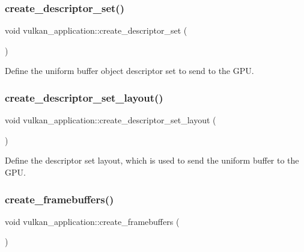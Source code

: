 \subsubsection{\texorpdfstring{create\+\_\+descriptor\+\_\+set()}{create\_descriptor\_set()}}
{\footnotesize\ttfamily void vulkan\+\_\+application\+::create\+\_\+descriptor\+\_\+set (\begin{DoxyParamCaption}{ }\end{DoxyParamCaption})\hspace{0.3cm}{\ttfamily [private]}}



Define the uniform buffer object descriptor set to send to the G\+PU. 

\mbox{\label{classvulkan__application_a85db969a681ae5ee7e43080ade7b7769}} 
\subsubsection{\texorpdfstring{create\+\_\+descriptor\+\_\+set\+\_\+layout()}{create\_descriptor\_set\_layout()}}
{\footnotesize\ttfamily void vulkan\+\_\+application\+::create\+\_\+descriptor\+\_\+set\+\_\+layout (\begin{DoxyParamCaption}{ }\end{DoxyParamCaption})\hspace{0.3cm}{\ttfamily [private]}}



Define the descriptor set layout, which is used to send the uniform buffer to the G\+PU. 

\mbox{\label{classvulkan__application_a219950641fc50e873c559972448be53e}} 
\subsubsection{\texorpdfstring{create\+\_\+framebuffers()}{create\_framebuffers()}}
{\footnotesize\ttfamily void vulkan\+\_\+application\+::create\+\_\+framebuffers (\begin{DoxyParamCaption}{ }\end{DoxyParamCaption})\hspace{0.3cm}{\ttfamily [private]}}



